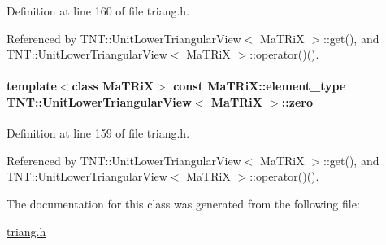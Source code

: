 Definition at line 160 of file triang.h.



Referenced by TNT::UnitLowerTriangularView$<$ MaTRiX $>$::get(), and TNT::UnitLowerTriangularView$<$ MaTRiX $>$::operator()().

\paragraph[{zero}]{\setlength{\rightskip}{0pt plus 5cm}template$<$class MaTRiX$>$ const MaTRiX::element\_\-type {\bf TNT::UnitLowerTriangularView}$<$ MaTRiX $>$::{\bf zero}}\hfill\label{class_t_n_t_1_1_unit_lower_triangular_view_a573785e76609e40a73ea6af93e0d0cd9}


Definition at line 159 of file triang.h.



Referenced by TNT::UnitLowerTriangularView$<$ MaTRiX $>$::get(), and TNT::UnitLowerTriangularView$<$ MaTRiX $>$::operator()().



The documentation for this class was generated from the following file:\begin{DoxyCompactItemize}
\item 
\hyperlink{triang_8h}{triang.h}\end{DoxyCompactItemize}
